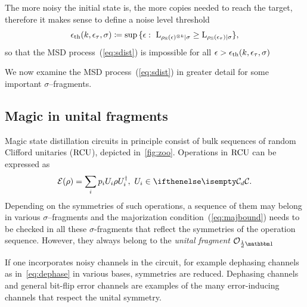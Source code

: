 \documentclass[pra,
aps,
twocolumn,
superscriptaddress,
groupedaddress,
nofootinbib,
reprint
]{revtex4-1}
\begin{document}
The more noisy the initial state is, the more copies needed to reach the target, therefore it makes sense to define a noise level threshold
\begin{equation}\label{eq:ethresh}
	\epsilon_{\rm{th}}(k, \epsilon_\tau, \sigma) \coloneqq \sup{\{\epsilon:\  {{\rm{L}}_{\rho_{\rm{S}}(\epsilon)^{\otimes k}|\sigma}}  \geq  {{\rm{L}}_{\rho_{\rm{S}}(\epsilon_{\tau})|\sigma}} \}},
\end{equation}
so that the MSD process~(\ref{eq:sdist}) is impossible for all $\epsilon > \epsilon_{\rm{th}}(k, \epsilon_\tau, \sigma)$

We now examine the MSD process~(\ref{eq:sdist}) in greater detail for some important $\sigma$--fragments.

\subsection{Magic in unital fragments}\label{sec:unital}

Magic state distillation circuits in principle consist of bulk sequences of random Clifford unitaries (${\rm{RCU}}$), depicted in~\cref{fig:zoo}.
Operations in ${\rm{RCU}}$ can be expressed as
\begin{equation}
    \E(\rho) = \sum_i p_i U_i \rho U_i^\dagger,\ U_i \in \cd.
\end{equation}
Depending on the symmetries of such operations, a sequence of them may belong in various $\sigma$--fragments and the majorization condition~(\ref{eq:majbound}) needs to be checked in all these $\sigma$-fragments that reflect the symmetries of the operation sequence.
However, they always belong to the \emph{unital fragment} $\O_{\frac{1}{d}\id}$

If one incorporates noisy channels in the circuit, for example dephasing channels as in~\cref{eq:dephase} in various bases, symmetries are reduced.
Dephasing channels and general bit-flip error channels are examples of the many error-inducing channels that respect the unital symmetry. 

\end{document}
